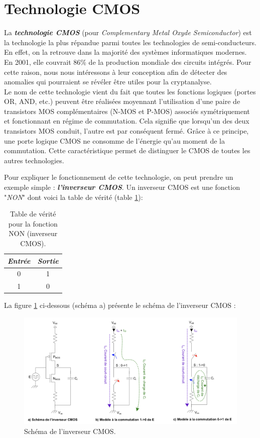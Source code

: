 \documentclass[oneside]{book}
\begin{document}
\section{Technologie CMOS}
\label{sec:CMOS}
La \textbf{\textit{technologie CMOS}} (pour \textit{Complementary Metal Oxyde Semiconductor}) est la technologie la plus répandue parmi toutes les technologies de semi-conducteurs. En effet, on la retrouve dans la majorité des systèmes informatiques modernes. En 2001, elle couvrait 86\% de la production mondiale des circuits intégrés. Pour cette raison, nous nous intéressons à leur conception afin de détecter des anomalies qui pourraient se révéler être utiles pour la cryptanalyse. \\
Le nom de cette technologie vient du fait que toutes les fonctions logiques (portes OR, AND, etc.) peuvent être réalisées moyennant l’utilisation d’une paire de transistors MOS complémentaires (N-MOS et P-MOS) associés symétriquement et fonctionnant en régime de commutation. Cela signifie que lorsqu'un des deux transistors MOS conduit, l’autre est par conséquent fermé. Grâce à ce principe, une porte logique CMOS ne consomme de l’énergie qu’au moment de la commutation. Cette caractéristique permet de distinguer le CMOS de toutes les autres technologies.

\hspace{-0.5 cm}Pour expliquer le fonctionnement de cette technologie, on peut prendre un exemple simple : \textbf{\textit{l'inverseur CMOS}}. Un inverseur CMOS est une fonction "\textit{NON}" dont voici la table de vérité (table \ref{tab:verite}):
\begin{table}[htbp]
	\centering
	\begin{tabular}{|c|c|}
    		\hline
   		  \textit{Entrée} & \textit{Sortie} \\ \hline 
   		  0 & 1 \\ 
   		  1 & 0 \\ \hline
	\end{tabular}
    	\caption{Table de vérité pour la fonction NON (inverseur CMOS).}
    	\label{tab:verite} 
\end{table}

\newpage

\hspace{-0.5 cm}La figure \ref{fig:CMOS} ci-dessous (schéma a) présente le schéma de l'inverseur CMOS :
\begin{figure}[htbp]
    \centering
    \includegraphics[scale=0.75]{image/CMOS}
    \caption{Schéma de l'inverseur CMOS.}
    \label{fig:CMOS} 
\end{figure}
\end{document}

